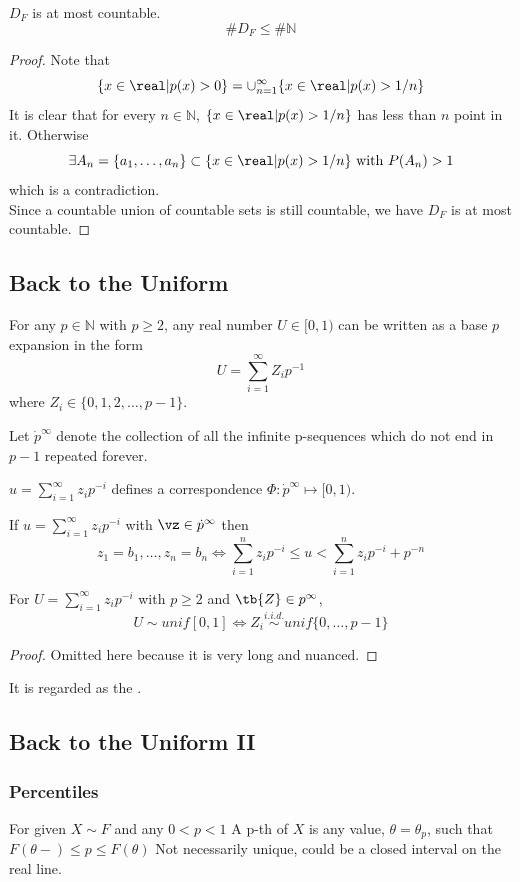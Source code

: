 \documentclass[11pt]{article}
\numberwithin{equation}{section}
\begin{document}
\proposition $D_F$ is at most countable.
$$\# D_F \leq \# \mathbb{N}$$
\begin{proof}
	Note that
	$$\{ x \in \real | p(x) > 0 \} = \cup_{n=1}^\infty \{ x \in \real | p(x) > 1/n\}$$
	It is clear that for every $n \in \mathbb{N}$, $\{ x \in \real | p(x) > 1/n\}$ has less than $n$ point in it. Otherwise
	$$\exists A_n = \{a_1, \hdots, a_n\} \subset \{x \in \real | p(x) > 1/n \} \text{ with } P(A_n) > 1$$
	which is a contradiction.\\
	Since a countable union of countable sets is still countable, we have $D_F$ is at most countable.
\end{proof}

\subsection{Back to the Uniform}
For any $p \in \mathbb{N}$ with $p \geq 2$, any real number $U \in [0, 1)$ can be written as a base $p$ expansion in the form
$$ U = \sum_{i=1}^\infty Z_i p^{-1}$$
where $Z_i \in \{0, 1, 2, \hdots, p-1\}$.

\notation
Let $\dot{p}^\infty$ denote the collection of all the infinite p-sequences which do not end in $p-1$ repeated forever.

$u = \sum_{i=1}^\infty z_i p^{-i}$ defines a correspondence $\Phi: \dot{p}^\infty \mapsto [0, 1)$.

If $u = \sum_{i=1}^\infty z_i p^{-i}$ with $\vz \in \dot{p}^\infty$ then
$$z_1 = b_1, \hdots, z_n = b_n \iff \sum_{i=1}^n z_i p^{-i} \leq u < \sum_{i=1}^n z_i p^{-i} + p^{-n}$$

For $U = \sum_{i=1}^\infty z_i p^{-i}$ with $p \geq 2$ and $\tb{Z} \in p^\infty$,
$$U \sim unif[0,1] \iff Z_i \overset{i.i.d.}{\sim} unif\{0, \hdots, p-1\}$$
\begin{proof}
	Omitted here because it is very long and nuanced.
\end{proof}
\remark 
It is regarded as the .

\subsection{Back to the Uniform II}
\subsubsection{Percentiles}
For  given $X \sim F$ and any $0 < p < 1$
 A p-th  of $X$ is any value, $\theta = \theta_p$, such that $F(\theta-) \leq p \leq F(\theta)$
\remark
Not necessarily unique, could be a closed interval on the real line.
\end{document}
